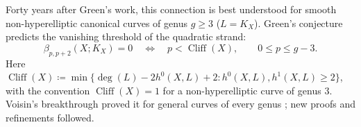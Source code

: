 \documentclass[11pt,reqno]{amsart}
\theoremstyle{remark}
\newcommand{\cliff}{\operatorname{Cliff}}
\newcommand{\CC}{\mathbb{C}}
\newcommand{\PP}{\mathbb{P}}
\begin{document}

Forty years after Green's work, this connection is best understood for smooth non-hyperelliptic canonical curves of genus $g\geq3$ ($L=K_X$). Green's conjecture \cite{green84-I} predicts the vanishing threshold of the quadratic strand:
\begin{equation}\label{eq:greens}
\beta_{p,p+2}(X;K_X)=0 \quad\Longleftrightarrow\quad p<\cliff(X),
\qquad 0\leq p\leq g-3.
\end{equation}
Here $\cliff(X)\coloneqq\min\{\deg(L)-2h^0(X,L)+2:h^0(X,L),h^1(X,L)\geq2\}$, with the convention $\cliff(X)=1$ for a non-hyperelliptic curve of genus $3$. Voisin's breakthrough proved it for general curves of every genus \cite{voisin02,voisin05}; new proofs \cite{aprodu19,raicuSam22,kemeny21,kemeny25Odd} and refinements \cite{farkasMustataPopa03,chiodoEFS13,farkasKemeny16,farkasKemeny17,deopurkar18,kemeny24} followed.
 
\end{document}
